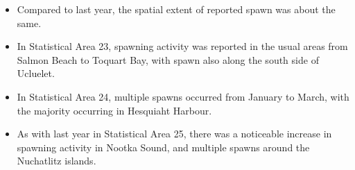 \begin{itemize}
\item Compared to last year, the spatial extent of reported spawn was about the same.
\item In Statistical Area 23, spawning activity was reported in the usual areas from Salmon Beach to Toquart Bay, with spawn also along the south side of Ucluelet.
\item In Statistical Area 24, multiple spawns occurred from January to March, with the majority occurring in Hesquiaht Harbour.
\item As with last year in Statistical Area 25, there was a noticeable increase in spawning activity in Nootka Sound, and multiple spawns around the Nuchatlitz islands.
\end{itemize}